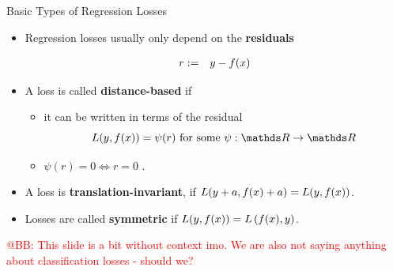 \begin{vbframe}{Basic Types of Regression Losses}


\begin{itemize}
  \item Regression losses usually only depend on the \textbf{ residuals}

  \vspace*{-0.5cm}

  \begin{eqnarray*}
    r &:=& y - \fx %
  \end{eqnarray*}

  \item A loss is called \textbf{distance-based} if
  \begin{itemize}
    \item it can be written in terms of the residual
    $$
      \Lxy = \psi (r) \text{ for some } \psi: \R \to \R
    $$
    \item $\psi(r) = 0 \Leftrightarrow r = 0$ .
  \end{itemize}
  \item A loss is \textbf{translation-invariant}, if $L(y + a, f(x) + a) = L(y, f(x))$.
  \item Losses are called \textbf{symmetric} if $L(y, f(x)) = L\left(f(x), y\right)$. 
\end{itemize}

  \textcolor{red}{@BB: This slide is a bit without context imo. We are also not saying anything about classification losses - should we? }

\end{vbframe}

